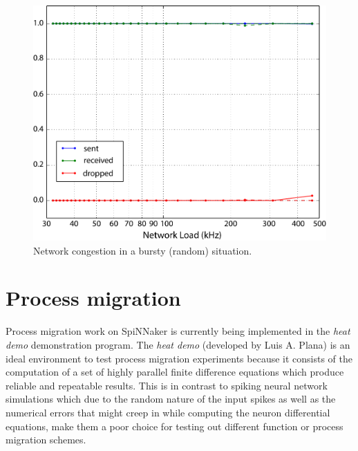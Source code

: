 \documentclass[oneside, a4paper, 11pt]{memoir}
\begin{document}
\begin{figure}[htbp]
	\centering
	\includegraphics[width=0.5\linewidth]{images/bursting_random2.pdf}
	\caption{Network congestion in a bursty (random) situation.}	
	\label{fig:bursting_random}
\end{figure}

\clearpage
\chapter{Process migration}
\label{sec:migration}

Process migration work on SpiNNaker is currently being implemented in the \emph{heat demo} demonstration program. The \emph{heat demo} (developed by Luis A. Plana) is an ideal environment to test process migration experiments because it consists of the computation of a set of highly parallel finite difference equations which produce reliable and repeatable results. This is in contrast to spiking neural network simulations which due to the random nature of the input spikes as well as the numerical errors that might creep in while computing the neuron differential equations, make them a poor choice for testing out different function or process migration schemes. 
\end{document}
